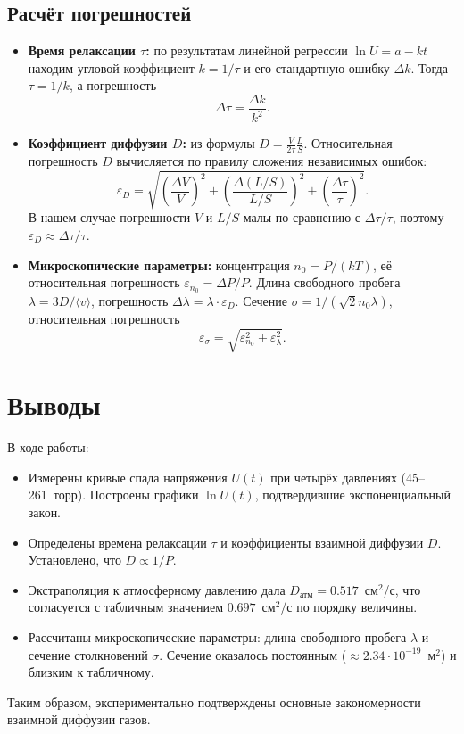 \documentclass[a4paper, 12pt]{article}
\begin{document}
\subsection{Расчёт погрешностей}
\begin{itemize}
    \item \textbf{Время релаксации $\tau$:} по результатам линейной регрессии $\ln U = a - k t$ находим угловой коэффициент $k = 1/\tau$ и его стандартную ошибку $\Delta k$. Тогда $\tau = 1/k$, а погрешность
    \begin{equation}
        \Delta \tau = \frac{\Delta k}{k^2}.
    \end{equation}
    
    \item \textbf{Коэффициент диффузии $D$:} из формулы $D = \frac{V}{2\tau}\frac{L}{S}$. Относительная погрешность $D$ вычисляется по правилу сложения независимых ошибок:
    \begin{equation}
        \varepsilon_D = \sqrt{\left(\frac{\Delta V}{V}\right)^2 + \left(\frac{\Delta (L/S)}{L/S}\right)^2 + \left(\frac{\Delta \tau}{\tau}\right)^2}.
    \end{equation}
    В нашем случае погрешности $V$ и $L/S$ малы по сравнению с $\Delta\tau/\tau$, поэтому $\varepsilon_D \approx \Delta\tau/\tau$.
    
    \item \textbf{Микроскопические параметры:} концентрация $n_0 = P/(kT)$, её относительная погрешность $\varepsilon_{n_0} = \Delta P/P$. Длина свободного пробега $\lambda = 3D/\langle v \rangle$, погрешность $\Delta\lambda = \lambda \cdot \varepsilon_D$. Сечение $\sigma = 1/(\sqrt{2}n_0\lambda)$, относительная погрешность
    \begin{equation}
        \varepsilon_\sigma = \sqrt{\varepsilon_{n_0}^2 + \varepsilon_\lambda^2}.
    \end{equation}
\end{itemize}

\section{Выводы}
В ходе работы:
\begin{itemize}
    \item Измерены кривые спада напряжения $U(t)$ при четырёх давлениях (45--261~торр). Построены графики $\ln U(t)$, подтвердившие экспоненциальный закон.
    \item Определены времена релаксации $\tau$ и коэффициенты взаимной диффузии $D$. Установлено, что $D \propto 1/P$.
    \item Экстраполяция к атмосферному давлению дала $D_{\text{атм}} = 0.517$~см$^2$/с, что согласуется с табличным значением $0.697$~см$^2$/с по порядку величины.
    \item Рассчитаны микроскопические параметры: длина свободного пробега $\lambda$ и сечение столкновений $\sigma$. Сечение оказалось постоянным ($\approx 2.34\cdot10^{-19}$~м$^2$) и близким к табличному.
\end{itemize}
Таким образом, экспериментально подтверждены основные закономерности взаимной диффузии газов.
\end{document}
